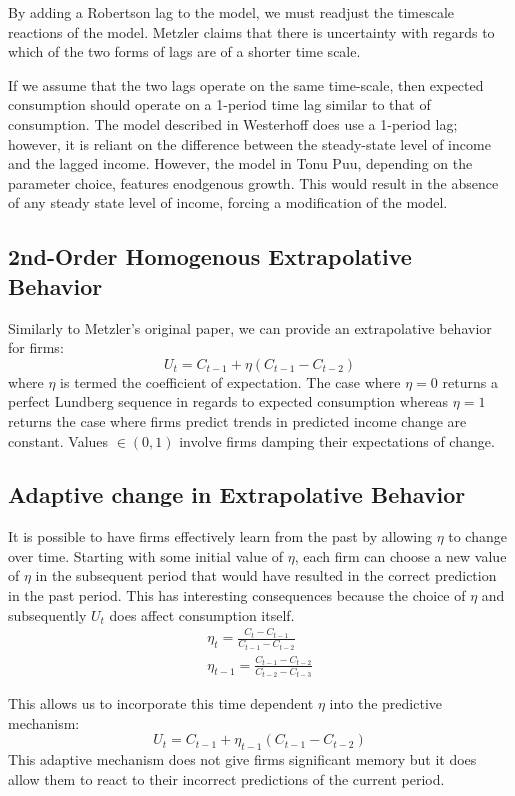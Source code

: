 \documentclass[]{article}
\begin{document}
By adding a Robertson lag to the model, we must readjust the timescale reactions of the model. Metzler claims that there is uncertainty with regards to which of the two forms of lags are of a shorter time scale. 

If we assume that the two lags operate on the same time-scale, then expected consumption should operate on a 1-period time lag similar to that of consumption. The model described in Westerhoff does use a 1-period lag; however, it is reliant on the difference between the steady-state level of income and the lagged income. However, the model in Tonu Puu, depending on the parameter choice, features enodgenous growth. This would result in the absence of any steady state level of income, forcing a modification of the model.
\subsection*{2nd-Order Homogenous Extrapolative Behavior}
Similarly to Metzler's original paper, we can provide an extrapolative behavior for firms:
\begin{equation}
	U_t=C_{t-1}+\eta(C_{t-1}-C_{t-2})
\end{equation}
where $\eta$ is termed the coefficient of expectation. The case where $\eta=0$ returns a perfect Lundberg sequence in regards to expected consumption whereas $\eta=1$ returns the case where firms predict trends in predicted income change are constant. Values $\in(0,1)$ involve firms damping their expectations of change. 
\subsection*{Adaptive change in Extrapolative Behavior}
It is possible to have firms effectively learn from the past by allowing $\eta$ to change over time. Starting with some initial value of $\eta$, each firm can choose a new value of $\eta$ in the subsequent period that would have resulted in the correct prediction in the past period. This has interesting consequences because the choice of $\eta$ and subsequently $U_t$ does affect consumption itself. 
\begin{gather}
	\eta_t = \frac{C_t-C_{t-1}}{C_{t-1}-C_{t-2}}\\
	\eta_{t-1} = \frac{C_{t-1}-C_{t-2}}{C_{t-2}-C_{t-3}}
\end{gather}

This allows us to incorporate this time dependent $\eta$ into the predictive mechanism:
\begin{equation}
	U_t=C_{t-1}+\eta_{t-1}(C_{t-1}-C_{t-2})
\end{equation}
This adaptive mechanism does not give firms significant memory but it does allow them to react to their incorrect predictions of the current period.
\end{document}
